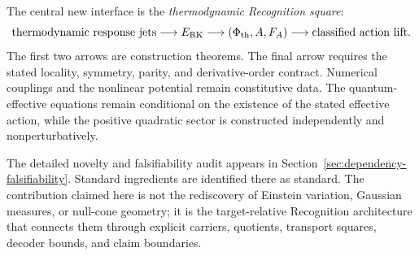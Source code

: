 The central new interface is the \emph{thermodynamic Recognition square}:
\begin{equation}
\text{thermodynamic response jets}
\longrightarrow
E_{\mathrm{RK}}
\longrightarrow
(\Phi_{\mathrm{th}},A,F_A)
\longrightarrow
\text{classified action lift}.
\label{eq:opening-recognition-chain}
\end{equation}
The first two arrows are construction theorems.  The final arrow requires the stated locality, symmetry, parity, and derivative-order contract.  Numerical couplings and the nonlinear potential remain constitutive data.  The quantum-effective equations remain conditional on the existence of the stated effective action, while the positive quadratic sector is constructed independently and nonperturbatively.

The detailed novelty and falsifiability audit appears in Section~\ref{sec:dependency-falsifiability}.  Standard ingredients are identified there as standard.  The contribution claimed here is not the rediscovery of Einstein variation, Gaussian measures, or null-cone geometry; it is the target-relative Recognition architecture that connects them through explicit carriers, quotients, transport squares, decoder bounds, and claim boundaries.
